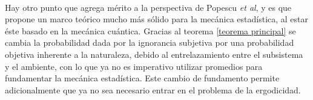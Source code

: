 \\
Hay otro punto que agrega mérito a la perspectiva de Popescu \textit{et al}, y es que propone un marco teórico mucho más sólido para la mecánica estadística, al estar éste basado en la mecánica cuántica. Gracias al teorema \ref{teorema principal} se cambia la probabilidad dada por la ignorancia subjetiva por una probabilidad objetiva inherente a la naturaleza, debido al entrelazamiento entre el subsistema y el ambiente, con lo que ya no es imperativo utilizar promedios para fundamentar la mecánica estadística. Este cambio de fundamento permite adicionalmente que ya no sea necesario entrar en el problema de la ergodicidad. 




